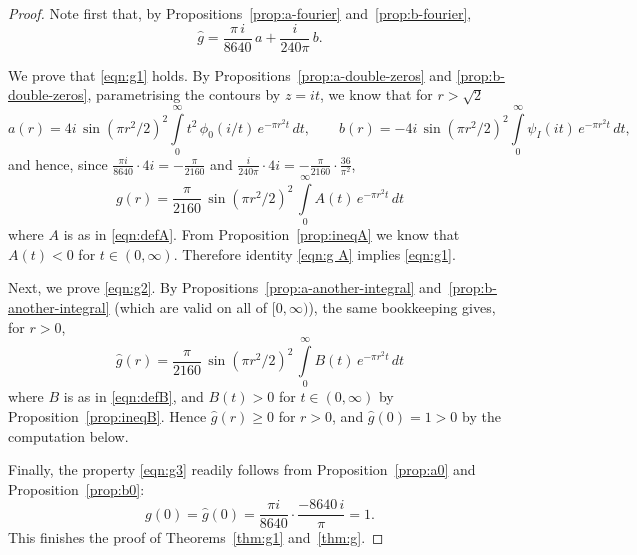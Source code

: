 \begin{proof}
Note first that, by Propositions~\ref{prop:a-fourier} and~\ref{prop:b-fourier},
$$\widehat{g}=\frac{\pi\,i}{8640}\,a+\frac{i}{240\pi}\,b.$$

We prove that \eqref{eqn:g1} holds. By Propositions~\ref{prop:a-double-zeros} and \ref{prop:b-double-zeros}, parametrising the contours by $z = it$, we know that for $r>\sqrt{2}$
$$a(r) = 4i\,\sin(\pi r^2/2)^2\int\limits_0^\infty t^2\,\phi_0(i/t)\,e^{-\pi r^2 t}\,dt, \qquad
b(r) = -4i\,\sin(\pi r^2/2)^2\int\limits_0^\infty \psi_I(it)\,e^{-\pi r^2 t}\,dt,$$
and hence, since $\frac{\pi i}{8640}\cdot 4i = -\frac{\pi}{2160}$ and $\frac{i}{240\pi}\cdot 4i = -\frac{\pi}{2160}\cdot\frac{36}{\pi^2}$,
\begin{equation}\label{eqn:g A} g(r)=\frac{\pi}{2160}\,\sin(\pi r^2/2)^2\,\int\limits_0^\infty A(t)\,e^{-\pi r^2 t}\,dt\end{equation}
where $A$ is as in \eqref{eqn:defA}.
From Proposition~\ref{prop:ineqA} we know that $A(t)<0$ for $t\in(0,\infty)$.
Therefore identity \eqref{eqn:g A} implies \eqref{eqn:g1}.

Next, we prove \eqref{eqn:g2}. By Propositions~\ref{prop:a-another-integral} and~\ref{prop:b-another-integral} (which are valid on all of $[0, \infty)$), the same bookkeeping gives, for $r>0$,
\begin{equation}\label{eqn:g B} \widehat{g}(r)=\frac{\pi}{2160}\,\sin(\pi r^2/2)^2\,\int\limits_0^\infty B(t)\,e^{-\pi r^2 t}\,dt\end{equation}
where $B$ is as in \eqref{eqn:defB}, and $B(t) > 0$ for $t \in (0, \infty)$ by Proposition~\ref{prop:ineqB}. Hence $\widehat{g}(r) \geq 0$ for $r > 0$, and $\widehat{g}(0) = 1 > 0$ by the computation below.

Finally, the property \eqref{eqn:g3} readily follows from Proposition~\ref{prop:a0} and Proposition~\ref{prop:b0}:
$$g(0) = \widehat{g}(0) = \frac{\pi i}{8640}\cdot\frac{-8640\,i}{\pi} = 1.$$
This finishes the proof of Theorems~\ref{thm:g1} and~\ref{thm:g}.
\end{proof}
